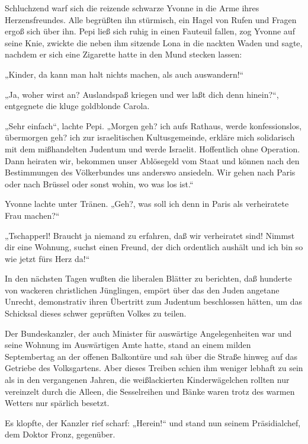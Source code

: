 Schluchzend warf sich die reizende schwarze Yvonne in die Arme
ihres Herzensfreundes. Alle begrüßten ihn stürmisch, ein Hagel von
Rufen und Fragen ergoß sich über ihn. Pepi ließ sich ruhig in einen
Fauteuil fallen, zog Yvonne auf seine Knie, zwickte die neben ihm
sitzende Lona in die nackten Waden und sagte, nachdem er sich eine
Zigarette hatte in den Mund stecken lassen:

„Kinder, da kann man halt nichts machen, als auch auswandern!“

„Ja, woher wirst an? Auslandspaß kriegen und wer
laßt dich denn hinein?“, entgegnete die kluge goldblonde Carola.

„Sehr einfach“, lachte Pepi. „Morgen geh? ich aufs Rathaus, werde
konfessionslos, übermorgen geh? ich zur israelitischen
Kultusgemeinde, erkläre mich solidarisch mit dem mißhandelten
Judentum und werde Israelit. Hoffentlich ohne Operation. Dann
heiraten wir, bekommen unser Ablösegeld vom Staat und können nach
den Bestimmungen des Völkerbundes uns anderswo ansiedeln. Wir gehen
nach Paris oder nach Brüssel oder sonst wohin, wo was los ist.“

Yvonne lachte unter Tränen. „Geh?, was soll ich denn in Paris als
verheiratete Frau machen?“

„Tschapperl! Braucht ja niemand zu erfahren, daß wir verheiratet
sind! Nimmst dir eine Wohnung, suchst einen Freund, der dich
ordentlich aushält und ich bin so wie jetzt fürs Herz da!“

In den nächsten Tagen wußten die liberalen Blätter zu berichten,
daß hunderte von wackeren christlichen Jünglingen, empört über das
den Juden angetane Unrecht, demonstrativ ihren Übertritt zum
Judentum beschlossen hätten, um das Schicksal dieses schwer
geprüften Volkes zu teilen.

\tb{* * *}
Der Bundeskanzler, der auch Minister für auswärtige
Angelegenheiten war und seine Wohnung im Auswärtigen Amte hatte,
stand an einem milden Septembertag an der offenen Balkontüre und
sah über die Straße hinweg auf das Getriebe des Volksgartens. Aber
dieses Treiben schien ihm weniger lebhaft zu sein als in den
vergangenen Jahren, die weißlackierten Kinderwägelchen rollten nur
vereinzelt durch die Alleen, die Sesselreihen und Bänke waren trotz
des warmen Wetters nur spärlich besetzt.

Es klopfte, der Kanzler rief scharf: „Herein!“ und stand nun seinem
Präsidialchef, dem Doktor Fronz, gegenüber.

